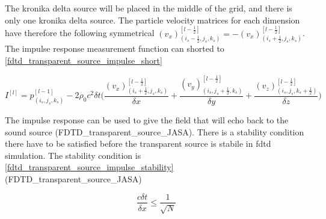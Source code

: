 The kronika delta source will be placed in the middle of the grid, and there is only one kronika delta source. The particle velocity matrices for each dimension have therefore the following symmetrical $(v_x)_{(i_{s}-\frac{1}{2},j_{s},k_{s})}^{[l-\frac{1}{2}]} = -(v_x)_{(i_{s}+\frac{1}{2},j_{s},k_{s})}^{[l-\frac{1}{2}]}$. The impulse response measurement function can shorted to \autoref{fdtd_transparent_source_impulse_short}

\begin{equation}\label{fdtd_transparent_source_impulse_short}
I^{[l]}=p_{(i_{s},j_{s},k_{s})}^{[l-1]} - 2\rho_0 c^2 \delta t  \Biggl( \frac{(v_x)_{(i_{s}+\frac{1}{2},j_{s},k_{s})}^{[l-\frac{1}{2}]}}{\delta x} +
 \frac{(v_y)_{(i_{s},j_{s}+\frac{1}{2},k_{s})}^{[l-\frac{1}{2}]}}{\delta y} +  
 \frac{(v_z)_{(i_{s},j_{s},k_{s}+\frac{1}{2})}^{[l-\frac{1}{2}]}}{\delta z} \Biggr)
\end{equation}

The impulse response can be used to give the field that will echo back to the sound source (FDTD_transparent_source_JASA). There is a stability condition there have to be satisfied before the transparent source is stabile in \gls{fdtd} simulation. The stability condition is \autoref{fdtd_transparent_source_impulse_stability} (FDTD_transparent_source_JASA) 


\begin{equation}\label{fdtd_transparent_source_impulse_stability}
\frac{c \delta t}{\delta x} \leq \frac{1}{\sqrt{N}}
\end{equation}

        \startexplain
    \stopexplain
